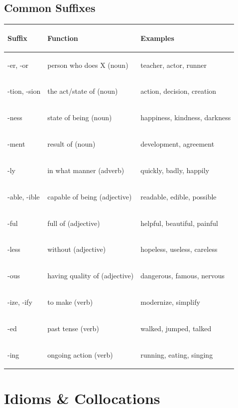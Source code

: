 \documentclass[11pt, letterpaper]{article}
\begin{document}
\subsection*{Common Suffixes}

\noindent
{\renewcommand{\arraystretch}{1.4}
\begin{tabularx}{\textwidth}{>{\bfseries\raggedright\arraybackslash}p{2cm}
                              >{\raggedright\arraybackslash}p{4cm}
                              >{\raggedright\arraybackslash}X}
\toprule
\rowcolor{tableheadergreen}
\textbf{Suffix} & \textbf{Function} & \textbf{Examples} \\
\midrule
\rowcolor{rowA}  -er, -or          & person who does X (noun)            & teacher, actor, runner \\
\rowcolor{rowBg} -tion, -sion      & the act/state of (noun)             & action, decision, creation \\
\rowcolor{rowA}  -ness             & state of being (noun)                & happiness, kindness, darkness \\
\rowcolor{rowBg} -ment             & result of (noun)                     & development, agreement \\
\rowcolor{rowA}  -ly               & in what manner (adverb)              & quickly, badly, happily \\
\rowcolor{rowBg} -able, -ible      & capable of being (adjective)         & readable, edible, possible \\
\rowcolor{rowA}  -ful              & full of (adjective)                  & helpful, beautiful, painful \\
\rowcolor{rowBg} -less             & without (adjective)                  & hopeless, useless, careless \\
\rowcolor{rowA}  -ous              & having quality of (adjective)        & dangerous, famous, nervous \\
\rowcolor{rowBg} -ize, -ify        & to make (verb)                       & modernize, simplify \\
\rowcolor{rowA}  -ed               & past tense (verb)                    & walked, jumped, talked \\
\rowcolor{rowBg} -ing              & ongoing action (verb)                & running, eating, singing \\
\bottomrule
\end{tabularx}}

\section*{Idioms \& Collocations}
\end{document}
